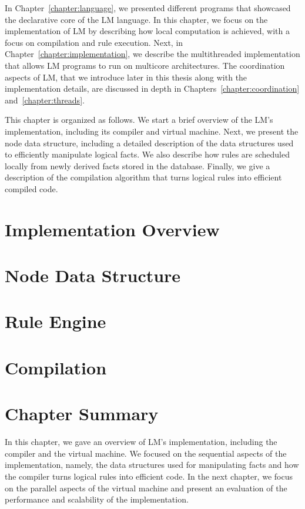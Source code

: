 
In Chapter~\ref{chapter:language}, we presented different programs that showcased the
declarative core of the LM language. In this chapter, we focus on the
implementation of LM by describing how local computation is achieved, with a
focus on compilation and rule execution.  Next, in
Chapter~\ref{chapter:implementation}, we describe the multithreaded
implementation that allows LM programs to run on multicore architectures. The
coordination aspects of LM, that we introduce later in this thesis along with
the implementation details, are discussed in depth in
Chapters~\ref{chapter:coordination} and~\ref{chapter:threads}.

This chapter is organized as follows. We start a brief overview of the LM's
implementation, including its compiler and virtual machine. Next, we present the
node data structure, including a detailed description of the data structures
used to efficiently manipulate logical facts.  We also describe how rules are
scheduled locally from newly derived facts stored in the database.  Finally, we
give a description of the compilation algorithm that turns logical rules into
efficient compiled code.


\section{Implementation Overview}


\section{Node Data Structure}\label{sec:data_structures}


\section{Rule Engine}\label{section:local:rule_engine}\label{sec:implementation:rule_engine}


\section{Compilation}


\section{Chapter Summary}

In this chapter, we gave an overview of LM's implementation, including the
compiler and the virtual machine. We focused on the sequential aspects of the
implementation, namely, the data structures used for manipulating facts and how
the compiler turns logical rules into efficient code. In the next chapter, we
focus on the parallel aspects of the virtual machine and present an evaluation
of the performance and scalability of the implementation.
